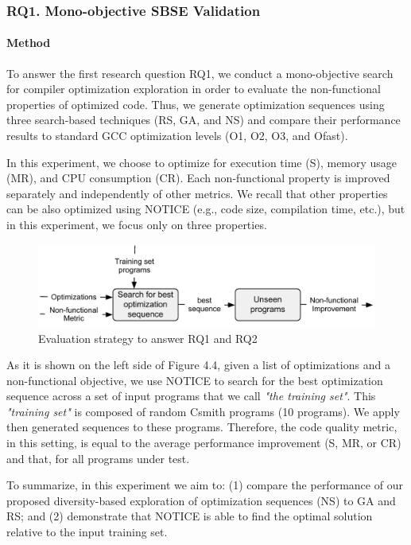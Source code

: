 \subsubsection{RQ1. Mono-objective SBSE Validation}
\paragraph{Method}

To answer the first research question RQ1, we conduct a mono-objective search for compiler optimization exploration in order to evaluate the non-functional properties of optimized code. Thus, we generate optimization sequences using three search-based techniques (RS, GA, and NS) and compare their performance results to standard GCC optimization levels (O1, O2, O3, and Ofast). 

In this experiment, we choose to optimize for execution time (S), memory usage (MR), and CPU consumption (CR). Each non-functional property is improved separately and independently of other metrics. We recall that other properties can be also optimized using NOTICE (e.g., code size, compilation time, etc.), but in this experiment, we focus only on three properties.


\begin{figure}[h]
	\centering
	\includegraphics[width=1.\linewidth]{chapitre3/fig/sensitivity.pdf}
	\caption{Evaluation strategy to answer RQ1 and RQ2}
	
\end{figure}


As it is shown on the left side of Figure 4.4, given a list of optimizations and a non-functional objective, we use NOTICE to search for the best optimization sequence across a set of input programs that we call \textit{"the training set"}. This \textit{"training set"} is composed of random Csmith programs (10 programs). We apply then generated sequences to these programs. Therefore, the code quality metric, in this setting, is equal to the average performance improvement (S, MR, or CR) and that, for all programs under test. 


To summarize, in this experiment we aim to: (1) compare the performance of our proposed diversity-based exploration of optimization sequences (NS) to GA and RS; and (2) demonstrate that NOTICE is able to find the optimal solution relative to the input training set.

